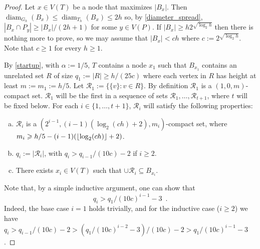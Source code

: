 \documentclass{patmorin}
\DeclareMathOperator{\diam}{diam}
\renewcommand{\le}{\leqslant}
\renewcommand{\ge}{\geqslant}
\renewcommand{\geq}{\geqslant}
\begin{document}
\begin{proof}
  Let $x\in V(T)$ be a node that maximizes $|B_x|$.  Then $\diam_{G_h}(B_x)\le\diam_{T_h}(B_x) \le 2h$ so, by \cref{diameter_spread}, $|B_x\cap P_y|\ge |B_x|/(2h+1)$ for some $y\in V(P)$.  If $|B_x|\ge h2^{\sqrt{\log_2 h}}$ then there is nothing more to prove, so we may assume that $|B_x| < ch$ where $c:= 2^{\sqrt{\log_2 h}}$.  Note that $c\ge 1$ for every $h\ge 1$.

  By \cref{startup}, with $\alpha:= 1/5$, $T$ contains a node $x_1$ such that $B_{x_1}$ contains an unrelated set $R$ of size $q_1:=|R|\ge h/(25c)$ where each vertex in $R$ has height at least $m:=m_1:=h/5$.  Let  $\mathcal{R}_1:=\{\{v\}:v\in R\}$.  By definition $\mathcal{R}_1$ is a $(1,0,m)$-compact set.  $\mathcal{R}_1$ will be the first in a sequence of sets $\mathcal{R}_1,\ldots,\mathcal{R}_{t+1}$, where $t$ will be fixed below. For each $i\in\{1,\ldots,t+1\}$, $\mathcal{R}_i$ will satisfy the following properties:
  \begin{enumerate}[(a)]
     \item $\mathcal{R}_i$ is a $(2^{i-1},(i-1)(\log_2(ch)+2),m_i)$-compact set, where $m_i \ge h/5-(i-1)(\floor{\log_2(ch)}+2)$. \label{ri_compact}
     \item $q_i:=|\mathcal{R}_i|$, with $q_i > q_{i-1}/(10c) - 2$ if $i\ge 2$. \label{ri_size}
     \item There exists $x_i\in V(T)$ such that $\cup\mathcal{R}_i\subseteq B_{x_i}$. \label{ri_containment}
  \end{enumerate}
  Note that, by a simple inductive argument, one can show that
  \[
  q_i > q_1/(10c)^{i-1} - 3 \enspace .
  \]
  Indeed, the base case $i=1$ holds trivially, and for the inductive case ($i\geq 2$) we have $q_i > q_{i-1}/(10c) - 2 > (q_1/(10c)^{i-2} - 3)/(10c) -2 > q_1/(10c)^{i-1} - 3$.


\end{proof}
\end{document}
